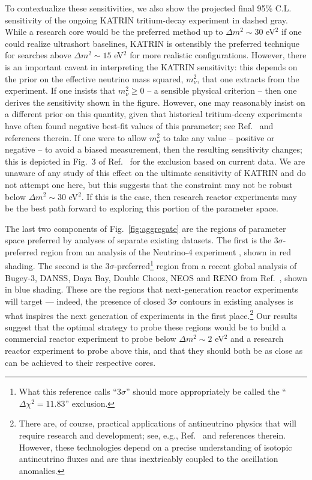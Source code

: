 \documentclass[prd, twocolumn, tightenlines, twoside, secnumarabic, superscriptaddress, preprintnumbers, nofootinbib, notitlepage]{revtex4-1}
\begin{document}
To contextualize these sensitivities, we also show the projected final 95\% C.L. sensitivity of the ongoing KATRIN tritium-decay experiment \cite{KATRIN:2020dpx} in dashed gray. While a research core would be the preferred method up to $\Delta m^2 \sim 30$ eV$^2$ if one could realize ultrashort baselines, KATRIN is ostensibly the preferred technique for searches above $\Delta m^2 \sim 15$ eV$^2$ for more realistic configurations. However, there is an important caveat in interpreting the KATRIN sensitivity: this depends on the prior on the effective neutrino mass squared, $m_\nu^2$, that one extracts from the experiment. If one insists that $m_\nu^2 \ge 0$ -- a sensible physical criterion -- then one derives the sensitivity shown in the figure. However, one may reasonably insist on a different prior on this quantity, given that historical tritium-decay experiments have often found negative best-fit values of this parameter; see Ref.~\cite{Formaggio:2021nfz} and references therein. If one were to allow $m_\nu^2$ to take any value -- positive or negative -- to avoid a biased measurement, then the resulting sensitivity changes; this is depicted in Fig.~3 of Ref.~\cite{KATRIN:2020dpx} for the exclusion based on current data. We are unaware of any study of this effect on the ultimate sensitivity of KATRIN and do not attempt one here, but this suggests that the constraint may not be robust below $\Delta m^2 \sim 30$ eV$^2$. If this is the case, then research reactor experiments may be the best path forward to exploring this portion of the parameter space.

The last two components of Fig.~\ref{fig:aggregate} are the regions of parameter space preferred by analyses of separate existing datasets. The first is the $3\sigma$-preferred region from an analysis of the Neutrino-4 experiment \cite{Neutrino4talk}, shown in red shading. The second is the $3\sigma$-preferred\footnote{What this reference calls ``$3\sigma$'' should more appropriately be called the ``$\Delta \chi^2 = 11.83$'' exclusion.} region from a recent global analysis of Bugey-3, DANSS, Daya Bay, Double Chooz, NEOS and RENO from Ref.~\cite{Berryman:2020agd}, shown in blue shading. These are the regions that next-generation reactor experiments will target --- indeed, the presence of closed $3\sigma$ contours in existing analyses is what inspires the next generation of experiments in the first place.\footnote{There are, of course, practical applications of antineutrino physics that will require research and development; see, e.g., Ref.~\cite{Bergevin:2019tcg} and references therein. However, these technologies depend on a precise understanding of isotopic antineutrino fluxes and are thus inextricably coupled to the oscillation anomalies.} Our results suggest that the optimal strategy to probe these regions would be to build a commercial reactor experiment to probe below $\Delta m^2 \sim 2$ eV$^2$ and a research reactor experiment to probe above this, and that they should both be as close as can be achieved to their respective cores.
\end{document}
